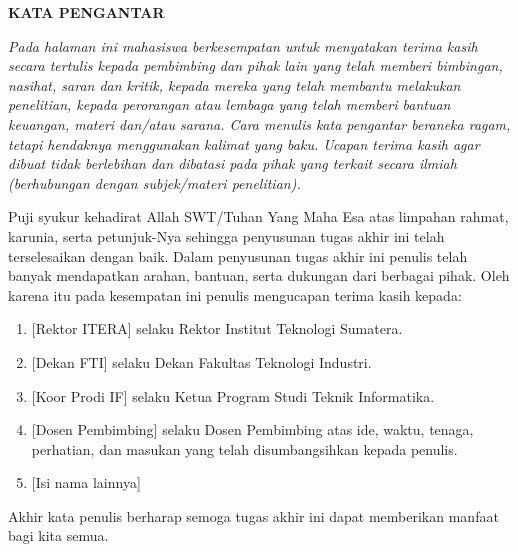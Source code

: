 \clearpage
{}%

\begin{justifying}
	\large \bfseries \centering \MakeUppercase{Kata Pengantar}\linebreak
	
	\normalsize \normalfont \justifying
	\textit{Pada halaman ini mahasiswa berkesempatan untuk menyatakan terima kasih secara tertulis kepada pembimbing dan pihak lain yang telah memberi bimbingan, nasihat, saran dan kritik, kepada mereka yang telah membantu melakukan penelitian, kepada perorangan atau lembaga yang telah memberi bantuan keuangan, materi dan/atau sarana. Cara menulis kata pengantar beraneka ragam, tetapi hendaknya menggunakan kalimat yang baku. Ucapan terima kasih agar dibuat tidak berlebihan dan dibatasi pada pihak yang terkait secara ilmiah (berhubungan dengan subjek/materi penelitian). } \par
	Puji syukur kehadirat Allah SWT/Tuhan Yang Maha Esa atas limpahan rahmat, karunia, serta petunjuk-Nya sehingga penyusunan tugas akhir ini telah terselesaikan dengan baik. Dalam penyusunan tugas akhir ini penulis telah banyak mendapatkan arahan, bantuan, serta dukungan dari berbagai pihak. Oleh karena itu pada kesempatan ini penulis mengucapan terima kasih kepada: \par
	\begin{enumerate}
		\item {[Rektor ITERA]} selaku Rektor Institut Teknologi Sumatera.  
		\item {[Dekan FTI]} selaku Dekan Fakultas Teknologi Industri.
		\item {[Koor Prodi IF]} selaku Ketua Program Studi Teknik Informatika.
		\item {[Dosen Pembimbing]} selaku Dosen Pembimbing atas ide, waktu, tenaga, perhatian, dan masukan yang telah disumbangsihkan kepada penulis.
		\item {[Isi nama lainnya]}
	\end{enumerate} \par
	Akhir kata penulis berharap semoga tugas akhir ini dapat memberikan manfaat bagi kita semua.
	\vfill
	
\end{justifying}
\clearpage





